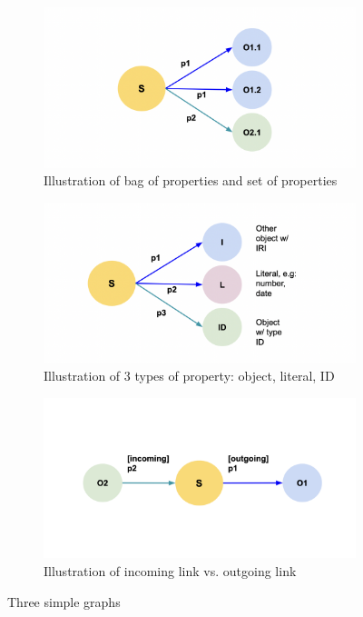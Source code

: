 \documentclass[
]{ceurart}
\begin{document}
\begin{figure}
     \centering
     \begin{subfigure}[b]{0.3\textwidth}
         \centering
         \includegraphics[scale=.3]{Wealth Type 1}
         \caption{Illustration of bag of properties and set of properties}
         \label{fig:wealth-type1}
     \end{subfigure}
     \hfill
     \begin{subfigure}[b]{0.3\textwidth}
         \centering
         \includegraphics[scale=.3]{Wealth Type 2}
         \caption{Illustration of 3 types of property: object, literal, ID}
         \label{fig:wealth-type2}
     \end{subfigure}
     \hfill
     \begin{subfigure}[b]{0.3\textwidth}
         \centering
         \includegraphics[scale=.3]{Wealth Type 3}
         \caption{Illustration of incoming link vs. outgoing link}
         \label{fig:wealth-type3}
     \end{subfigure}
     \caption{Three simple graphs}
     \label{fig:three graphs}
\end{figure}
\end{document}
